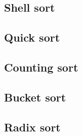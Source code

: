 \subsection{Shell sort}

\subsection{Quick sort}

\subsection{Counting sort}

\subsection{Bucket sort}

\subsection{Radix sort}

